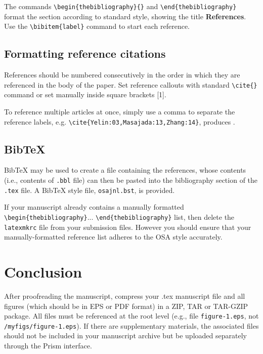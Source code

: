 \documentclass{osa-article}
\begin{document}
The commands \verb+\begin{thebibliography}{}+ and \verb+\end{thebibliography}+ format the section according to standard style, showing the title {\bfseries References}.  Use the \verb+\bibitem{label}+ command to start each reference.

\subsection{Formatting reference citations}
References should be numbered consecutively in the order in which they are referenced in the body of the paper. Set reference callouts with standard \verb+\cite{}+ command or set manually inside square brackets [1].

To reference multiple articles at once, simply use a comma to separate the reference labels, e.g. \verb+\cite{Yelin:03,Masajada:13,Zhang:14}+, produces \cite{Yelin:03,Masajada:13,Zhang:14}.

\subsection{Bib\TeX}
\label{sec:bibtex}
Bib\TeX{} may be used to create a file containing the references, whose contents (i.e., contents of \texttt{.bbl} file) can then be pasted into the bibliography section of the \texttt{.tex} file. A Bib\TeX{} style file, \texttt{osajnl.bst}, is provided.

If your manuscript already contains a manually formatted \verb|\begin{thebibliography}|... \verb|\end{thebibliography}| list, then delete the \texttt{latexmkrc} file from your submission files. However you should ensure that your manually-formatted reference list adheres to the OSA style accurately.

\section{Conclusion}
After proofreading the manuscript, compress your .tex manuscript file and all figures (which should be in EPS or PDF format) in a ZIP, TAR or TAR-GZIP package. All files must be referenced at the root level (e.g., file \texttt{figure-1.eps}, not \texttt{/myfigs/figure-1.eps}). If there are supplementary materials, the associated files should not be included in your manuscript archive but be uploaded separately through the Prism interface.
\end{document}
